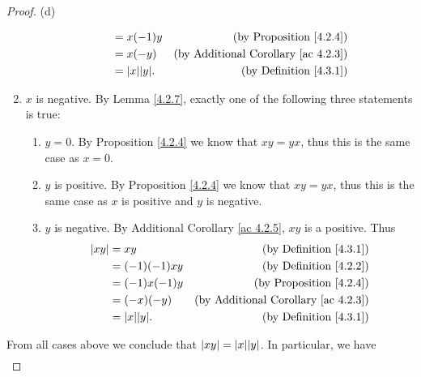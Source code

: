 \begin{proof}{(d)}
\begin{enumerate}[label=(\Roman*)]
\begin{enumerate}[label=(\roman*)]
\begin{align*}
                                      & = x(-1)y             & \text{(by Proposition \ref{4.2.4})}             \\
                                      & = x(-y)              & \text{(by Additional Corollary \ref{ac 4.2.3})} \\
                                      & = \abs*{x} \abs*{y}. & \text{(by Definition \ref{4.3.1})}              \\
                        \end{align*}
              \end{enumerate}
        \item \(x\) is negative.
              By Lemma \ref{4.2.7}, exactly one of the following three statements is true:
              \begin{enumerate}[label=(\roman*)]
                  \item \(y = 0\).
                        By Proposition \ref{4.2.4} we know that \(xy = yx\), thus this is the same case as \(x = 0\).
                  \item \(y\) is positive.
                        By Proposition \ref{4.2.4} we know that \(xy = yx\), thus this is the same case as \(x\) is positive and \(y\) is negative.
                  \item \(y\) is negative.
                        By Additional Corollary \ref{ac 4.2.5}, \(xy\) is a positive.
                        Thus
                        \begin{align*}
                            \abs*{xy} & = xy                 & \text{(by Definition \ref{4.3.1})}              \\
                                      & = (-1)(-1)xy         & \text{(by Definition \ref{4.2.2})}              \\
                                      & = (-1)x(-1)y         & \text{(by Proposition \ref{4.2.4})}             \\
                                      & = (-x)(-y)           & \text{(by Additional Corollary \ref{ac 4.2.3})} \\
                                      & = \abs*{x} \abs*{y}. & \text{(by Definition \ref{4.3.1})}
                        \end{align*}
              \end{enumerate}
    \end{enumerate}
    From all cases above we conclude that \(\abs*{xy} = \abs*{x} \abs*{y}\).
    In particular, we have
    \begin{align*}

\end{align*}
\end{proof}
